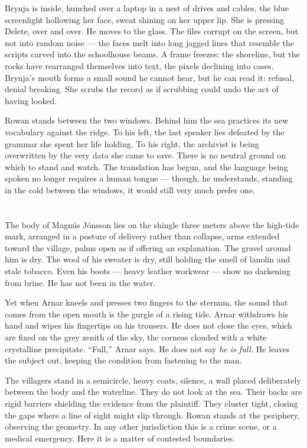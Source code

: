 \documentclass[11pt,oneside]{book}
\begin{document}
Brynja is inside, hunched over a laptop in a nest of drives and cables,
the blue screenlight hollowing her face, sweat shining on her upper lip.
She is pressing Delete, over and over. He moves to the glass. The files
corrupt on the screen, but not into random noise --- the faces melt into
long jagged lines that resemble the scripts carved into the schoolhouse
beams. A frame freezes: the shoreline, but the rocks have rearranged
themselves into text, the pixels declining into cases. Brynja's mouth
forms a small sound he cannot hear, but he can read it: refusal, denial
breaking. She scrubs the record as if scrubbing could undo the act of
having looked.

Rowan stands between the two windows. Behind him the sea practices its
new vocabulary against the ridge. To his left, the last speaker lies
defeated by the grammar she spent her life holding. To his right, the
archivist is being overwritten by the very data she came to save. There
is no neutral ground on which to stand and watch. The translation has
begun, and the language being spoken no longer requires a human tongue
--- though, he understands, standing in the cold between the windows, it
would still very much prefer one.

\chapter{}

The body of Magnús Jónsson lies on the shingle three meters above the
high-tide mark, arranged in a posture of delivery rather than collapse,
arms extended toward the village, palms open as if offering an
explanation. The gravel around him is dry. The wool of his sweater is
dry, still holding the smell of lanolin and stale tobacco. Even his
boots --- heavy leather workwear --- show no darkening from brine. He
has not been in the water.

Yet when Arnar kneels and presses two fingers to the sternum, the sound
that comes from the open mouth is the gurgle of a rising tide. Arnar
withdraws his hand and wipes his fingertips on his trousers. He does not
close the eyes, which are fixed on the grey zenith of the sky, the
corneas clouded with a white crystalline precipitate. ``Full,'' Arnar
says. He does not say \emph{he is full.} He leaves the subject out,
keeping the condition from fastening to the man.

The villagers stand in a semicircle, heavy coats, silence, a wall placed
deliberately between the body and the waterline. They do not look at the
sea. Their backs are rigid barriers shielding the evidence from the
plaintiff. They cluster tight, closing the gaps where a line of sight
might slip through. Rowan stands at the periphery, observing the
geometry. In any other jurisdiction this is a crime scene, or a medical
emergency. Here it is a matter of contested boundaries.
\end{document}
